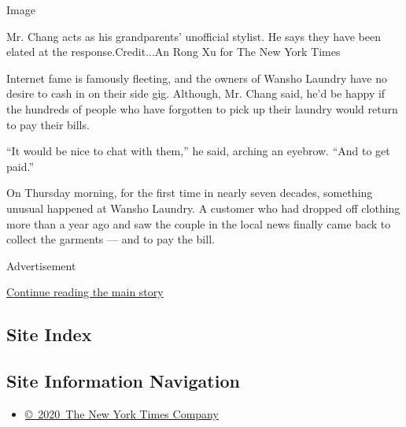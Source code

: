Image

Mr. Chang acts as his grandparents' unofficial stylist. He says they
have been elated at the response.Credit...An Rong Xu for The New York
Times

Internet fame is famously fleeting, and the owners of Wansho Laundry
have no desire to cash in on their side gig. Although, Mr. Chang said,
he'd be happy if the hundreds of people who have forgotten to pick up
their laundry would return to pay their bills.

``It would be nice to chat with them,'' he said, arching an eyebrow.
``And to get paid.''

On Thursday morning, for the first time in nearly seven decades,
something unusual happened at Wansho Laundry. A customer who had dropped
off clothing more than a year ago and saw the couple in the local news
finally came back to collect the garments --- and to pay the bill.

Advertisement

\protect\hyperlink{after-bottom}{Continue reading the main story}

\hypertarget{site-index}{%
\subsection{Site Index}\label{site-index}}

\hypertarget{site-information-navigation}{%
\subsection{Site Information
Navigation}\label{site-information-navigation}}

\begin{itemize}
\tightlist
\item
  \href{https://help.nytimes.com/hc/en-us/articles/115014792127-Copyright-notice}{©~2020~The
  New York Times Company}
\end{itemize}

